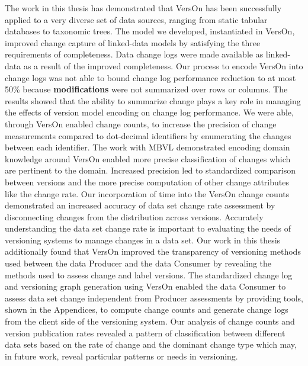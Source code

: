 The work in this thesis has demonstrated that VersOn has been successfully applied to a very diverse set of data sources, ranging from static tabular databases to taxonomic trees.
The model we developed, instantiated in VersOn, improved change capture of linked-data models by satisfying the three requirements of completeness.
Data change logs were made available as linked-data as a result of the improved completeness.
Our process to encode VersOn into change logs was not able to bound change log performance reduction to at most 50\% because \textbf{modifications} were not summarized over rows or columns.
The results showed that the ability to summarize change plays a key role in managing the effects of version model encoding on change log performance.
We were able, through VersOn enabled change counts, to increase the precision of change measurements compared to dot-decimal identifiers by enumerating the changes between each identifier.
The work with MBVL demonstrated encoding domain knowledge around VersOn enabled more precise classification of changes which are pertinent to the domain.
Increased precision led to standardized comparison between versions and the more precise computation of other change attributes like the change rate.
Our incorporation of time into the VersOn change counts demonstrated an increased accuracy of data set change rate assessment by disconnecting changes from the distribution across versions.
Accurately understanding the data set change rate is important to evaluating the needs of versioning systems to manage changes in a data set.
Our work in this thesis additionally found that VersOn improved the transparency of versioning methods used between the data Producer and the data Consumer by revealing the methods used to assess change and label versions.
The standardized change log and versioning graph generation using VersOn enabled the data Consumer to assess data set change independent from Producer assessments by providing tools, shown in the Appendices, to compute change counts and generate change logs from the client side of the versioning system.
Our analysis of change counts and version publication rates revealed a pattern of classification between different data sets based on the rate of change and the dominant change type which may, in future work, reveal particular patterns or needs in versioning.